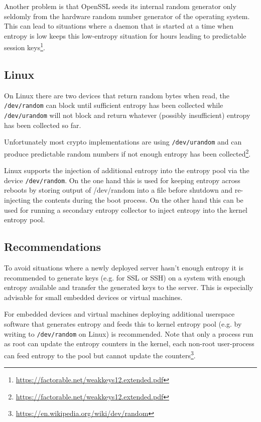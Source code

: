 Another problem is that OpenSSL seeds its internal random generator only
seldomly from the hardware random number generator of the operating
system. This can lead to situations where a daemon that is started at a
time when entropy is low keeps this low-entropy situation for hours
leading to predictable session
keys\footnote{\url{https://factorable.net/weakkeys12.extended.pdf}}.

\subsection{Linux}

On Linux there are two devices that return random bytes when read, the
\verb+/dev/random+ can block until sufficient entropy has been collected
while \verb+/dev/urandom+ will not block and return whatever (possibly
insufficient) entropy has been collected so far.

Unfortunately most crypto implementations are using \verb+/dev/urandom+
and can produce predictable random numbers if not enough entropy has
been
collected\footnote{\url{https://factorable.net/weakkeys12.extended.pdf}}.

Linux supports the injection of additional entropy into the entropy pool
via the device \verb+/dev/random+. On the one hand this is used for
keeping entropy across reboots by storing output of /dev/random into a
file before shutdown and re-injecting the contents during the boot
process. On the other hand this can be used for running a secondary
entropy collector to inject entropy into the kernel entropy pool.

\subsection{Recommendations}

To avoid situations where a newly deployed server hasn't enough
entropy it is recommended to generate keys (e.g. for SSL or SSH) on
a system with enough entropy available and transfer the generated keys
to the server.  This is especially advisable for small embedded devices
or virtual machines.

For embedded devices and virtual machines deploying additional userspace
software that generates entropy and feeds this to kernel entropy pool
(e.g. by writing to \verb+/dev/random+ on Linux) is recommended. Note
that only a process run as root can update the entropy counters in the
kernel, each non-root user-process can feed entropy to the pool but
cannot update the
counters\footnote{\url{https://en.wikipedia.org/wiki/dev/random}}.

